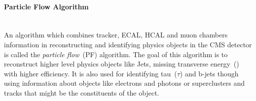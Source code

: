 \paragraph*{Particle Flow Algorithm} \mbox{}\\
An algorithm which combines tracker, ECAL, HCAL  and muon chambers information in reconstructing and identifying physics objects in the CMS detector is called the \textit{particle flow}~(PF) algorithm.
The goal of this algorithm is to reconstruct higher  level physics objects like Jets, missing transverse energy~(\MET) with higher efficiency. It is also used for identifying tau~($\tau$) and b-jets though using information about objects like electrons and photons or superclusters and tracks that might be the constituents of the object.

